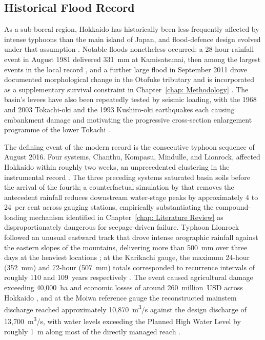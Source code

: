 \subsection{Historical Flood Record}
\label{subsec: Historical Flood Record}

As a sub-boreal region, Hokkaido has historically been less frequently affected by intense typhoons than the main island of Japan, and flood-defence design evolved under that assumption \parencite{furuichi_2018}. Notable floods nonetheless occurred: a 28-hour rainfall event in August 1981 delivered 331~mm at Kamisatsunai, then among the largest events in the local record \parencite{furuichi_2018}, and a further large flood in September 2011 drove documented morphological change in the Otofuke tributary and is incorporated as a supplementary survival constraint in Chapter~\ref{chap: Methodology} \parencite{kyuka_2020}. The basin's levees have also been repeatedly tested by seismic loading, with the 1968 and 2003 Tokachi-oki and the 1993 Kushiro-oki earthquakes each causing embankment damage and motivating the progressive cross-section enlargement programme of the lower Tokachi \parencite{fukuoka_2019, oyo_1999}.

The defining event of the modern record is the consecutive typhoon sequence of August 2016. Four systems, Chanthu, Kompasu, Mindulle, and Lionrock, affected Hokkaido within roughly two weeks, an unprecedented clustering in the instrumental record \parencite{kimura_2018}. The three preceding systems saturated basin soils before the arrival of the fourth; a counterfactual simulation by \textcite{kimura_2018} that removes the antecedent rainfall reduces downstream water-stage peaks by approximately 4 to 24~per cent across gauging stations, empirically substantiating the compound-loading mechanism identified in Chapter~\ref{chap: Literature Review} as disproportionately dangerous for seepage-driven failure. Typhoon Lionrock followed an unusual eastward track that drove intense orographic rainfall against the eastern slopes of the mountains, delivering more than 500~mm over three days at the heaviest locations \parencite{kimura_2018, furuichi_2018}; at the Karikachi gauge, the maximum 24-hour (352~mm) and 72-hour (507~mm) totals corresponded to recurrence intervals of roughly 110 and 109~years respectively \parencite{furuichi_2018}. The event caused agricultural damage exceeding 40{,}000~ha and economic losses of around 260~million~USD across Hokkaido \parencite{kimura_2018}, and at the Moiwa reference gauge the reconstructed mainstem discharge reached approximately 10{,}870~m\textsuperscript{3}/s against the design discharge of 13{,}700~m\textsuperscript{3}/s, with water levels exceeding the Planned High Water Level by roughly 1~m along most of the directly managed reach \parencite{fukuoka_2019}.

